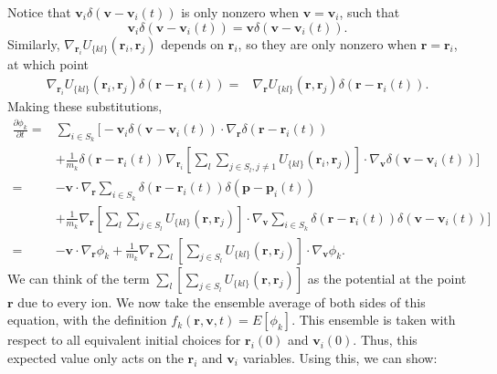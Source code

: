 \documentclass{article}
\begin{document}
Notice that $\mathbf{v}_i\delta(\mathbf{v}-\mathbf{v}_i(t))$ is only nonzero when $\mathbf{v}=\mathbf{v}_i$, such that 
\begin{equation*}\mathbf{v}_i\delta(\mathbf{v}-\mathbf{v}_i(t))=\mathbf{v}\delta(\mathbf{v}-\mathbf{v}_i(t)).\end{equation*} 
Similarly, $\nabla_{\mathbf{r}_{i}}U_{\{kl\}}(\mathbf{r}_{i},\mathbf{r}_{j})$ depends on $\mathbf{r}_{i}$, so they are only nonzero when $\mathbf{r}=\mathbf{r}_{i}$, at which point 
\begin{align*}\nabla_{\mathbf{r}_{i}}U_{\{kl\}}(\mathbf{r}_{i},\mathbf{r}_{j})\delta(\mathbf{r}-\mathbf{r}_{i}(t))=&\nabla_\mathbf{r}U_{\{kl\}}(\mathbf{r},\mathbf{r}_{j})\delta(\mathbf{r}-\mathbf{r}_{i}(t)).\end{align*}
Making these substitutions,
\begin{align*}
\frac{\partial \phi_k}{\partial t}=&\sum_{i\in S_k}\bigg[-\mathbf{v}_i\delta(\mathbf{v}-\mathbf{v}_i(t))\cdot\nabla_\mathbf{r}\delta(\mathbf{r}-\mathbf{r}_i(t))\\&+\frac{1}{m_k}\delta(\mathbf{r}-\mathbf{r}_i(t))\nabla_{\mathbf{r}_{i}}\left[\sum_l\sum_{j\in S_l,j\neq 1}U_{\{kl\}}(\mathbf{r}_{i},\mathbf{r}_{j})\right]\cdot \nabla_\mathbf{v}\delta(\mathbf{v}-\mathbf{v}_i(t))\bigg]\\
=&-\mathbf{v}\cdot\nabla_\mathbf{r}\sum_{i\in S_k}\delta(\mathbf{r}-\mathbf{r}_i(t))\delta(\mathbf{p}-\mathbf{p}_i(t))\\&+\frac{1}{m_k}\nabla_{\mathbf{r}}\left[\sum_l\sum_{j\in S_l}U_{\{kl\}}(\mathbf{r},\mathbf{r}_{j})\right]\cdot \nabla_\mathbf{v}\sum_{i\in S_k}\delta(\mathbf{r}-\mathbf{r}_i(t))\delta(\mathbf{v}-\mathbf{v}_i(t))\bigg]\\
=&-\mathbf{v}\cdot \nabla_\mathbf{r}\phi_k+\frac{1}{m_k}\nabla_\mathbf{r}\sum_l\left[\sum_{j\in S_l}U_{\{kl\}}(\mathbf{r},\mathbf{r}_j)\right]\cdot \nabla_\mathbf{v} \phi_k.
\end{align*}
We can think of the term $\sum_l\left[\sum_{j\in S_l}U_{\{kl\}}(\mathbf{r},\mathbf{r}_j)\right]$ as the potential at the point $\mathbf{r}$ due to every ion. We now take the ensemble average of both sides of this equation, with the definition $f_k(\mathbf{r},\mathbf{v},t)=E[\phi_k]$. This ensemble is taken with respect to all equivalent initial choices for $\mathbf{r}_i(0)$ and $\mathbf{v}_i(0)$. Thus, this expected value only acts on the $\mathbf{r}_i$ and $\mathbf{v}_i$ variables. Using this, we can show:
\end{document}
